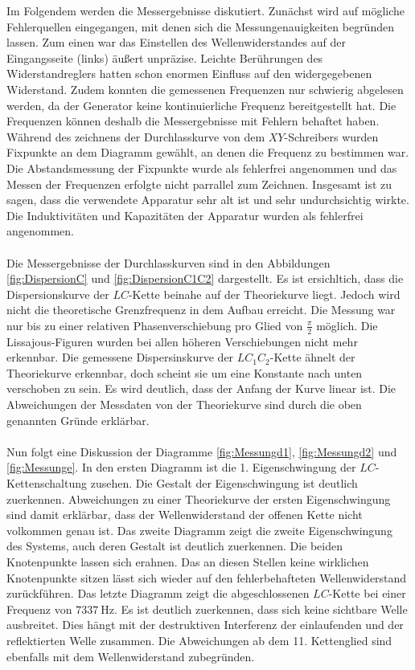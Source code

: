 Im Folgendem werden die Messergebnisse diskutiert.
Zunächst wird auf mögliche Fehlerquellen eingegangen, mit denen sich die Messungenauigkeiten
begründen lassen. Zum einen war das Einstellen des Wellenwiderstandes auf der
Eingangsseite (links) äußert unpräzise. Leichte Berührungen des Widerstandreglers
hatten schon enormen Einfluss auf den widergegebenen Widerstand.
Zudem konnten die gemessenen Frequenzen nur schwierig abgelesen werden, da der
Generator keine kontinuierliche Frequenz bereitgestellt hat. Die Frequenzen
können deshalb die Messergebnisse mit Fehlern behaftet haben.
Während des zeichnens der Durchlasskurve von dem $XY$-Schreibers wurden Fixpunkte
an dem Diagramm gewählt, an denen die Frequenz zu bestimmen war. Die Abstandsmessung
der Fixpunkte wurde als fehlerfrei angenommen und das Messen der Frequenzen
erfolgte nicht parrallel zum Zeichnen.
Insgesamt ist zu sagen, dass die verwendete Apparatur sehr alt ist und sehr
undurchsichtig wirkte.
Die Induktivitäten und Kapazitäten der Apparatur wurden als fehlerfrei angenommen.\\ \\
Die Messergebnisse der Durchlasskurven sind in den Abbildungen \ref{fig:DispersionC}
und \ref{fig:DispersionC1C2} dargestellt. Es ist ersichltich, dass
die Dispersionskurve der $LC$-Kette beinahe auf der Theoriekurve liegt.
Jedoch wird nicht die theoretische Grenzfrequenz in dem Aufbau erreicht.
Die Messung war nur bis zu einer relativen Phasenverschiebung pro Glied von
$\frac{\pi}{2}$ möglich. Die Lissajous-Figuren wurden bei allen höheren
Verschiebungen nicht mehr erkennbar. Die gemessene Dispersinskurve der
$LC_1C_2$-Kette ähnelt der Theoriekurve erkennbar, doch scheint sie um eine
Konstante nach unten verschoben zu sein. Es wird deutlich, dass der Anfang
der Kurve linear ist. Die Abweichungen der Messdaten von der Theoriekurve
sind durch die oben genannten Gründe erklärbar.\\ \\
Nun folgt eine Diskussion der Diagramme \ref{fig:Messungd1}, \ref{fig:Messungd2}
und \ref{fig:Messunge}. In den ersten Diagramm ist die 1. Eigenschwingung der
$LC$-Kettenschaltung zusehen. Die Gestalt der Eigenschwingung ist deutlich
zuerkennen. Abweichungen zu einer Theoriekurve der ersten Eigenschwingung
sind damit erklärbar, dass der Wellenwiderstand der offenen Kette nicht
volkommen genau ist.
Das zweite Diagramm zeigt die zweite Eigenschwingung des Systems, auch deren
Gestalt ist deutlich zuerkennen. Die beiden Knotenpunkte lassen sich erahnen.
Das an diesen Stellen keine wirklichen Knotenpunkte sitzen lässt sich wieder auf
den fehlerbehafteten Wellenwiderstand zurückführen.
Das letzte Diagramm zeigt die abgeschlossenen $LC$-Kette bei einer Frequenz
von $\SI{7337}{\hertz}$. Es ist deutlich zuerkennen, dass sich keine sichtbare
Welle ausbreitet. Dies hängt mit der destruktiven Interferenz der
einlaufenden und der reflektierten Welle zusammen. Die Abweichungen ab dem 11.
Kettenglied sind ebenfalls mit dem Wellenwiderstand zubegründen.



%
